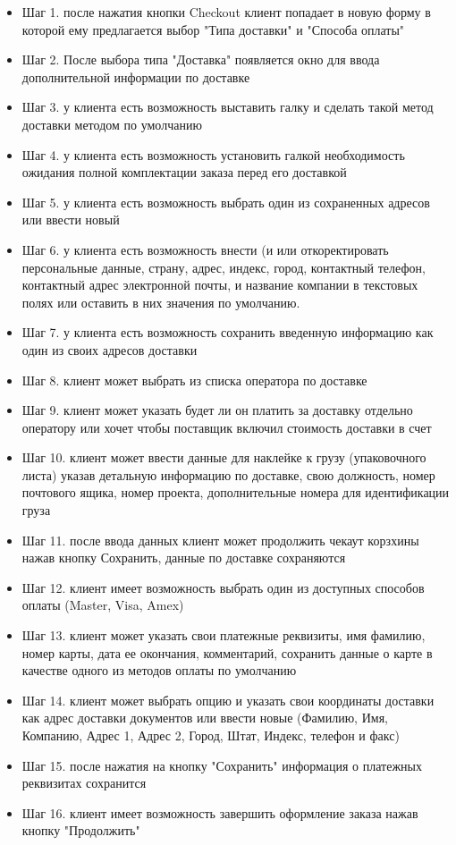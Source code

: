 {


\begin{wikilong}
\begin{itemize}
\item Шаг 1. после нажатия кнопки Checkout клиент попадает в новую форму в которой ему предлагается выбор "Типа доставки" и "Способа оплаты"
\item Шаг 2. После выбора типа "Доставка" появляется окно для ввода дополнительной информации по доставке
\item Шаг 3. у клиента есть возможность выставить галку и сделать такой метод доставки методом по умолчанию
\item Шаг 4. у клиента есть возможность установить галкой необходимость ожидания полной комплектации заказа перед его доставкой
\item Шаг 5. у клиента есть возможность выбрать один из сохраненных адресов или ввести новый
\item Шаг 6. у клиента есть возможность внести (и или откоректировать персональные данные, страну, адрес, индекс, город, контактный телефон, контактный адрес электронной почты, и название компании в текстовых полях или оставить в них значения по умолчанию.
\item Шаг 7. у клиента есть возможность сохранить введенную информацию как один из своих адресов доставки
\item Шаг 8. клиент может выбрать из списка оператора по доставке
\item Шаг 9. клиент может указать будет ли он платить за доставку отдельно оператору или хочет чтобы поставщик включил стоимость доставки в счет
\item Шаг 10. клиент может ввести данные для наклейке к грузу (упаковочного листа) указав детальную информацию по доставке, свою должность, номер почтового ящика, номер проекта, дополнительные номера для идентификации груза
\item Шаг 11. после ввода данных клиент может продолжить чекаут корзхины нажав кнопку Сохранить, данные по доставке сохраняются
\item Шаг 12. клиент имеет возможность выбрать один из доступных способов оплаты (Master, Visa, Amex)
\item Шаг 13. клиент может указать свои платежные реквизиты, имя фамилию, номер карты, дата ее окончания, комментарий, сохранить данные о карте в качестве одного из методов оплаты по умолчанию
\item Шаг 14. клиент может выбрать опцию и указать свои координаты доставки как адрес доставки документов или ввести новые (Фамилию, Имя, Компанию, Адрес 1, Адрес 2, Город, Штат, Индекс, телефон и факс)
\item Шаг 15. после нажатия на кнопку "Сохранить" информация о платежных реквизитах сохранится
\item Шаг 16. клиент имеет возможность завершить оформление заказа нажав кнопку "Продолжить"
\end{itemize}


\end{wikilong}}
